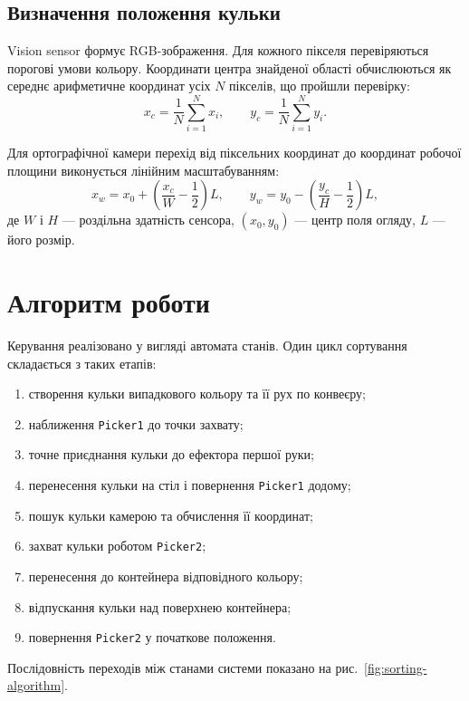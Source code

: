 \documentclass[12pt,a4paper]{article}
\begin{document}
\subsection{Визначення положення кульки}

Vision sensor формує RGB-зображення. Для кожного пікселя перевіряються
порогові умови кольору. Координати центра знайденої області обчислюються
як середнє арифметичне координат усіх \(N\) пікселів, що пройшли перевірку:
\begin{equation}
  x_{c}=\frac{1}{N}\sum_{i=1}^{N}x_{i},
  \qquad
  y_{c}=\frac{1}{N}\sum_{i=1}^{N}y_{i}.
\end{equation}

Для ортографічної камери перехід від піксельних координат до координат
робочої площини виконується лінійним масштабуванням:
\begin{equation}
  x_{w}=x_{0}+\left(\frac{x_{c}}{W}-\frac{1}{2}\right)L,
  \qquad
  y_{w}=y_{0}-\left(\frac{y_{c}}{H}-\frac{1}{2}\right)L,
\end{equation}
де \(W\) і \(H\) --- роздільна здатність сенсора,
\((x_{0},y_{0})\) --- центр поля огляду, \(L\) --- його розмір.

\section{Алгоритм роботи}

Керування реалізовано у вигляді автомата станів. Один цикл сортування
складається з таких етапів:
\begin{enumerate}
  \item створення кульки випадкового кольору та її рух по конвеєру;
  \item наближення \texttt{Picker1} до точки захвату;
  \item точне приєднання кульки до ефектора першої руки;
  \item перенесення кульки на стіл і повернення \texttt{Picker1} додому;
  \item пошук кульки камерою та обчислення її координат;
  \item захват кульки роботом \texttt{Picker2};
  \item перенесення до контейнера відповідного кольору;
  \item відпускання кульки над поверхнею контейнера;
  \item повернення \texttt{Picker2} у початкове положення.
\end{enumerate}

Послідовність переходів між станами системи показано на
рис.~\ref{fig:sorting-algorithm}.
\end{document}
